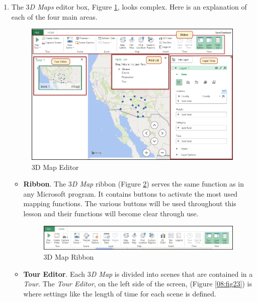 \begin{enumerate}[resume]
	\item The \textit{$ 3 $D Maps} editor box, Figure \ref{08:fig21}, looks complex. Here is an explanation of each of the four main areas.

	\begin{figure}[H]
		\centering
		\includegraphics[width=\maxwidth{.95\linewidth}]{gfx/ch08_fig21}
		\caption{$ 3 $D Map Editor}
		\label{08:fig21}
	\end{figure}
	
	\begin{itemize}
		\item \textbf{Ribbon}. The \textit{$ 3 $D Map} ribbon (Figure \ref{08:fig22}) serves the same function as in any Microsoft program. It contains buttons to activate the most used mapping functions. The various buttons will be used throughout this lesson and their functions will become clear through use.

		\begin{figure}[H]
			\centering
			\includegraphics[width=\maxwidth{.95\linewidth}]{gfx/ch08_fig22}
			\caption{$ 3 $D Map Ribbon}
			\label{08:fig22}
		\end{figure}

		\item \textbf{Tour Editor}. Each \textit{$ 3 $D Map} is divided into scenes that are contained in a \textit{Tour}. The \textit{Tour Editor}, on the left side of the screen, (Figure \ref{08:fig23}) is where settings like the length of time for each scene is defined.


\end{itemize}
\end{enumerate}
